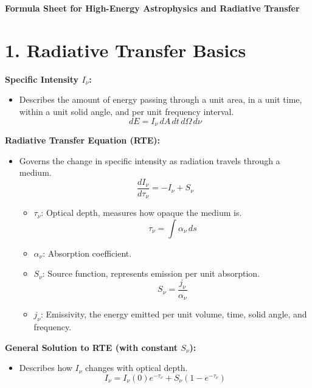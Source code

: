 \documentclass{article}
\begin{document}
\begin{center}
    \Large\textbf{Formula Sheet for High-Energy Astrophysics and Radiative Transfer}
\end{center}

\section*{1. Radiative Transfer Basics}

\textbf{Specific Intensity \( I_\nu \):}
\begin{itemize}
    \item Describes the amount of energy passing through a unit area, in a unit time, within a unit solid angle, and per unit frequency interval.
          \[
              dE = I_\nu \, dA \, dt \, d\Omega \, d\nu
          \]
\end{itemize}

\textbf{Radiative Transfer Equation (RTE):}
\begin{itemize}
    \item Governs the change in specific intensity as radiation travels through a medium.
          \[
              \frac{dI_\nu}{d\tau_\nu} = -I_\nu + S_\nu
          \]
          \begin{itemize}
              \item \( \tau_\nu \): Optical depth, measures how opaque the medium is.
                    \[
                        \tau_\nu = \int \alpha_\nu \, ds
                    \]
              \item \( \alpha_\nu \): Absorption coefficient.
              \item \( S_\nu \): Source function, represents emission per unit absorption.
                    \[
                        S_\nu = \frac{j_\nu}{\alpha_\nu}
                    \]
              \item \( j_\nu \): Emissivity, the energy emitted per unit volume, time, solid angle, and frequency.
          \end{itemize}
\end{itemize}

\textbf{General Solution to RTE (with constant \( S_\nu \)):}
\begin{itemize}
    \item Describes how \( I_\nu \) changes with optical depth.
          \[
              I_\nu = I_\nu(0) e^{-\tau_\nu} + S_\nu \left(1 - e^{-\tau_\nu}\right)
          \]
\end{itemize}
\end{document}
